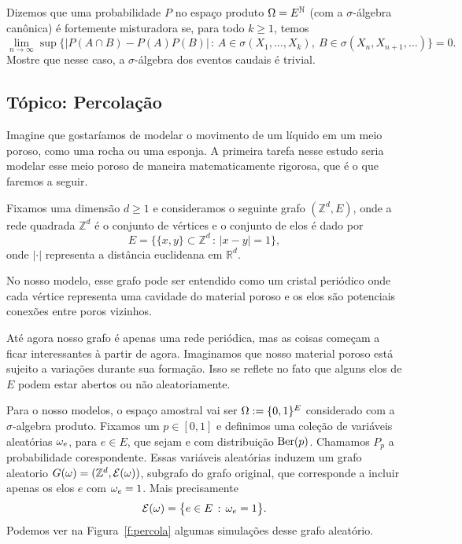 \begin{exercise}
  Dizemos que uma probabilidade $P$ no espaço produto $\Omega = E^{{\mathbb N}}$ (com a $\sigma$-álgebra canônica) é fortemente misturadora se, para todo $k \geq 1$, temos
  \begin{equation}
    \lim_{n \to \infty} \sup \{ \big| P(A \cap B) - P(A) P(B) \big| \, : \, A \in \sigma(X_1, \dots, X_k), \ B \in \sigma(X_n, X_{n+1}, \dots) \}= 0.
  \end{equation}
  Mostre que nesse caso, a $\sigma$-álgebra dos eventos caudais é trivial.
\end{exercise}


 \begin{topics}
\section{Tópico: Percolação}
\label{s:percolacao}

Imagine que gostaríamos de modelar o movimento de um líquido em um meio poroso, como uma rocha ou uma esponja.
A primeira tarefa nesse estudo seria modelar esse meio poroso de maneira matematicamente rigorosa, que é o que faremos a seguir.

Fixamos uma dimensão $d \geq 1$ e consideramos o seguinte grafo $(\mathbb{Z}^d, E)$,
onde a rede quadrada $\mathbb{Z}^d$ é o conjunto de vértices e o conjunto de elos é dado por
\begin{equation*}
  E = \big\{ \{x, y\} \subset \mathbb{Z}^d \, : \,  |x - y| = 1 \},
\end{equation*}
onde $|\cdot|$ representa a distância euclideana em $\mathbb{R}^d$.

No nosso modelo, esse grafo pode ser entendido como um cristal periódico onde cada vértice representa uma cavidade do material poroso e os elos são potenciais conexões entre poros vizinhos.

Até agora nosso grafo é apenas uma rede periódica, mas as coisas começam a ficar interessantes à partir de agora.
Imaginamos que nosso material poroso está sujeito a variações durante sua formação.
Isso se reflete no fato que alguns elos de $E$ podem estar abertos ou não aleatoriamente.

Para o nosso modelos, o espaço amostral vai ser $\Omega:= \{0,1\}^E$ considerado com a $\sigma$-algebra produto.
Fixamos um $p \in [0,1]$ e definimos uma coleção de variáveis aleatórias $\omega_e$, para $e \in E$, que sejam \iid e com distribuição $\operatorname{Ber}(p)$.
Chamamos $P_p$ a probabilidade corespondente.
Essas variáveis aleatórias induzem um grafo aleatorio $G(\omega)=(\mathbb{Z}^d, \mathcal{E}(\omega))$, subgrafo do grafo original,
que corresponde a incluir apenas os elos $e$ com $\omega_e = 1$.
Mais precisamente
\begin{equation}
  \mathcal{E}(\omega) = \big\{ e \in E\, : \, \omega_e = 1 \big\}.
\end{equation}
Podemos ver na Figura~\ref{f:percola} algumas simulações desse grafo aleatório.


\end{topics}
